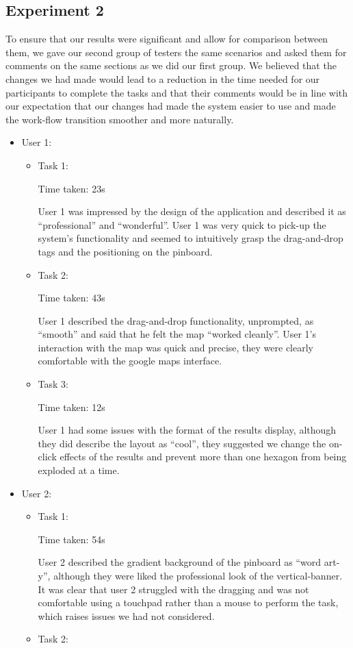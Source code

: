 \documentclass[10pt,a4paper]{article}
\begin{document}
\subsection*{Experiment 2}

To ensure that our results were significant and allow for comparison between them, we gave our second group of testers the same scenarios and asked them for comments on the same sections as we did our first group. We believed that the changes we had made would lead to a reduction in the time needed for our participants to complete the tasks and that their comments would be in line with our expectation that our changes had made the system easier to use and made the work-flow transition smoother and more naturally.

\begin{itemize}

\item{User 1:

\begin{itemize}
\item{Task 1:

Time taken: 23s

User 1 was impressed by the design of the application and described it as “professional” and “wonderful”.
User 1 was very quick to pick-up the system’s functionality and seemed to intuitively grasp the drag-and-drop tags and the positioning on the pinboard.}
\item{Task 2:

Time taken: 43s

User 1 described the drag-and-drop functionality, unprompted, as “smooth” and said that he felt the map “worked cleanly”.
User 1’s interaction with the map was quick and precise, they were clearly comfortable with the google maps interface.}
\item{Task 3:

Time taken: 12s

User 1 had some issues with the format of the results display, although they did describe the layout as “cool”, they suggested we change the on-click effects of the results and prevent more than one hexagon from being exploded at a time.}
\end{itemize}}

\item{User 2:
\begin{itemize}
\item{Task 1:

Time taken: 54s

User 2 described the gradient background of the pinboard as “word art-y”, although they were liked the professional look of the vertical-banner.
It was clear that user 2 struggled with the dragging and was not comfortable using a touchpad rather than a mouse to perform the task, which raises issues we had not considered.}
\item{Task 2:

}
\end{itemize}}
\end{itemize}
\end{document}
